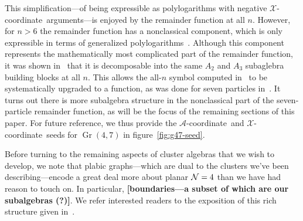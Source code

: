 \documentclass[11pt]{article}
\DeclareMathOperator{\Gr}{Gr}
\def\xcoord{$\mathcal{X}$-coordinate}
\def\acoord{$\mathcal{A}$-coordinate}
\def\draftnote#1{{\bf [#1]}}
\begin{document}
This simplification---of being expressible as polylogarithms with negative \xcoord\ arguments---is enjoyed by the remainder function at all $n$. However, for $n>6$ the remainder function has a nonclassical component, which is only expressible in terms of generalized polylogarithms~\cite{}. Although this component represents the mathematically most complicated part of the remainder function, it was shown in~\cite{} that it is decomposable into the same $A_2$ and $A_3$ subaglebra building blocks at all $n$. This allows the all-$n$ symbol computed in~\cite{} to be systematically upgraded to a function, as was done for seven particles in~\cite{}. It turns out there is more subalgebra structure in the nonclassical part of the seven-particle remainder function, as will be the focus of the remaining sections of this paper. For future reference, we thus provide the \acoord\ and \xcoord\ seeds for $\Gr(4,7)$ in figure~\ref{fig:g47-seed}.

Before turning to the remaining aspects of cluster algebras that we wish to develop, we note that plabic graphs---which are dual to the clusters we've been describing---encode a great deal more about planar ${\cal N}=4$ than we have had reason to touch on. In particular, \draftnote{boundaries---a subset of which are our subalgebras (?)}. We refer interested readers to the exposition of this rich structure given in~\cite{ArkaniHamed:2012nw}.
\end{document}
